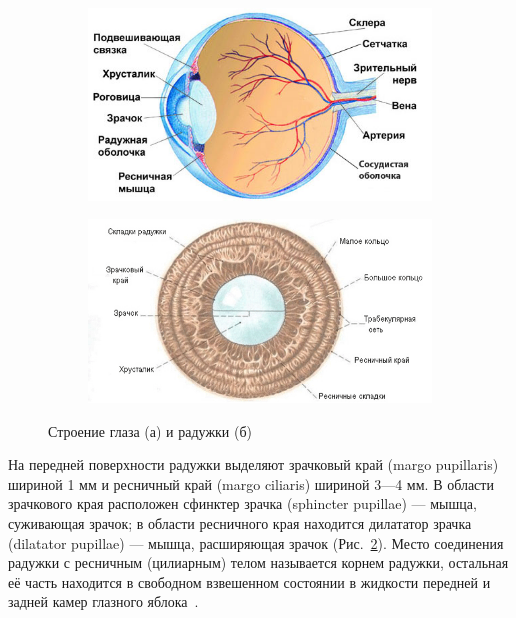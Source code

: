 \begin{figure}[!h]
	\begin{subfigure}{.5\textwidth}
		\centering
		\includegraphics[width=0.95\columnwidth]{pictures/eye-scheme.jpg}
		\caption{}
		\label{fig:eye_scheme}
	\end{subfigure}%
	\begin{subfigure}{.5\textwidth}
		\centering
		\includegraphics[width=0.95\columnwidth]{pictures/iris-structure.png}
		\caption{}
		\label{fig:iris_structure}
\end{subfigure}%
\caption{Строение глаза (а) и радужки (б)}
\label{fig:eye_and_iris_structure}
\end{figure}

На передней поверхности радужки выделяют зрачковый край (margo pupillaris) шириной 1 мм и ресничный край (margo ciliaris) шириной 3—4 мм. В области зрачкового края расположен сфинктер зрачка (sphincter pupillae) — мышца, суживающая зрачок; в области ресничного края находится дилататор зрачка (dilatator pupillae) — мышца, расширяющая зрачок (Рис.~\ref{fig:iris_structure}). Место соединения радужки с ресничным (цилиарным) телом называется корнем радужки, остальная её часть находится в свободном взвешенном состоянии в жидкости передней и задней камер глазного яблока~\cite{krasnov_1952}.

